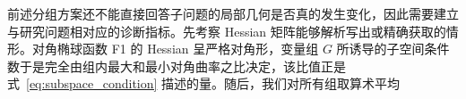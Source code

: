 前述分组方案还不能直接回答子问题的局部几何是否真的发生变化，因此需要建立与研究问题相对应的诊断指标。先考察 Hessian 矩阵能够解析写出或精确获取的情形。对角椭球函数 F1 的 Hessian 呈严格对角形，变量组 $G$ 所诱导的子空间条件数于是完全由组内最大和最小对角曲率之比决定，该比值正是式~\eqref{eq:subspace_condition} 描述的量。随后，我们对所有组取算术平均